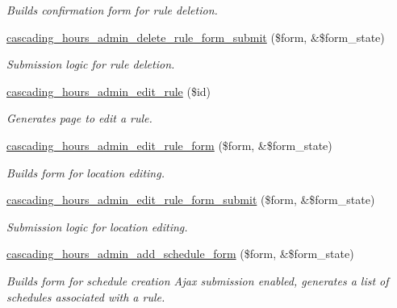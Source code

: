 \begin{DoxyCompactItemize}
\begin{DoxyCompactList}\small\item\em Builds confirmation form for rule deletion. \end{DoxyCompactList}\item 
\hyperlink{cascading__hours_8admin_8php_a14427be08e46eaae79d5f5af58204187_a14427be08e46eaae79d5f5af58204187}{cascading\+\_\+hours\+\_\+admin\+\_\+delete\+\_\+rule\+\_\+form\+\_\+submit} (\$form, \&\$form\+\_\+state)
\begin{DoxyCompactList}\small\item\em Submission logic for rule deletion. \end{DoxyCompactList}\item 
\hyperlink{cascading__hours_8admin_8php_acb4b52112f97af8049d40a7f05956bd1_acb4b52112f97af8049d40a7f05956bd1}{cascading\+\_\+hours\+\_\+admin\+\_\+edit\+\_\+rule} (\$id)
\begin{DoxyCompactList}\small\item\em Generates page to edit a rule. \end{DoxyCompactList}\item 
\hyperlink{cascading__hours_8admin_8php_acfed64ec633bff9a42395c24c040f322_acfed64ec633bff9a42395c24c040f322}{cascading\+\_\+hours\+\_\+admin\+\_\+edit\+\_\+rule\+\_\+form} (\$form, \&\$form\+\_\+state)
\begin{DoxyCompactList}\small\item\em Builds form for location editing. \end{DoxyCompactList}\item 
\hyperlink{cascading__hours_8admin_8php_aed96ff9532714a4d9bcf48e63ff4d6c0_aed96ff9532714a4d9bcf48e63ff4d6c0}{cascading\+\_\+hours\+\_\+admin\+\_\+edit\+\_\+rule\+\_\+form\+\_\+submit} (\$form, \&\$form\+\_\+state)
\begin{DoxyCompactList}\small\item\em Submission logic for location editing. \end{DoxyCompactList}\item 
\hyperlink{cascading__hours_8admin_8php_a9b2e894393962d6ff93edaa6771b8b70_a9b2e894393962d6ff93edaa6771b8b70}{cascading\+\_\+hours\+\_\+admin\+\_\+add\+\_\+schedule\+\_\+form} (\$form, \&\$form\+\_\+state)
\begin{DoxyCompactList}\small\item\em Builds form for schedule creation Ajax submission enabled, generates a list of schedules associated with a rule. \end{DoxyCompactList}\item 

\end{DoxyCompactItemize}
